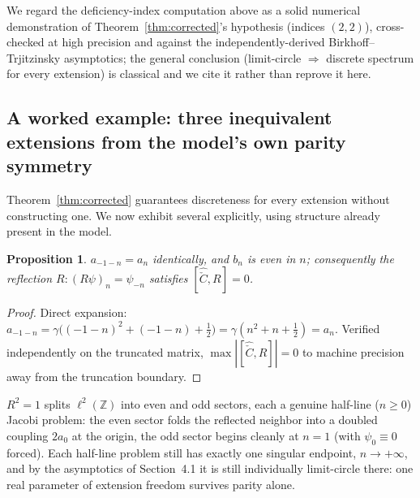 \documentclass[11pt]{amsart}
\newtheorem{proposition}[theorem]{Proposition}
\theoremstyle{remark}
\begin{document}
We regard the deficiency-index computation above as a solid numerical demonstration of Theorem~\ref{thm:corrected}'s hypothesis (indices $(2,2)$), cross-checked at high precision and against the independently-derived Birkhoff--Trjitzinsky asymptotics; the general conclusion (limit-circle $\Rightarrow$ discrete spectrum for every extension) is classical and we cite it rather than reprove it here.

\subsection{A worked example: three inequivalent extensions from the model's own parity symmetry}

Theorem~\ref{thm:corrected} guarantees discreteness for every extension without constructing one. We now exhibit several explicitly, using structure already present in the model.

\begin{proposition}\label{prop:parity}
$a_{-1-n}=a_n$ identically, and $b_n$ is even in $n$; consequently the reflection $R:(R\psi)_n=\psi_{-n}$ satisfies $[\hat{\check C},R]=0$.
\end{proposition}
\begin{proof}
Direct expansion: $a_{-1-n}=\gamma\big((-1-n)^2+(-1-n)+\tfrac12\big)=\gamma(n^2+n+\tfrac12)=a_n$. Verified independently on the truncated matrix, $\max|[\hat{\check C},R]|=0$ to machine precision away from the truncation boundary.
\end{proof}

$R^2=1$ splits $\ell^2(\mathbb Z)$ into even and odd sectors, each a genuine half-line ($n\geq0$) Jacobi problem: the even sector folds the reflected neighbor into a doubled coupling $2a_0$ at the origin, the odd sector begins cleanly at $n=1$ (with $\psi_0\equiv0$ forced). Each half-line problem still has exactly one singular endpoint, $n\to+\infty$, and by the asymptotics of Section~4.1 it is still individually limit-circle there: one real parameter of extension freedom survives parity alone.
\end{document}
